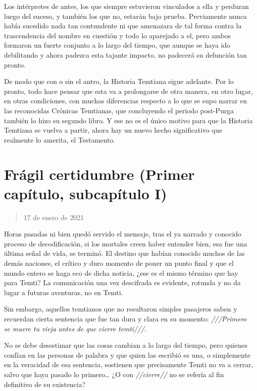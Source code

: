 \documentclass[
  spanish,
]{book}
\begin{document}
Los intérpretes de antes, los que siempre estuvieron vinculados a ella y perduran luego del suceso, y también los que no, estarán bajo prueba. Previamente nunca había sucedido nada tan contundente ni que amenazara de tal forma contra la trascendencia del nombre en cuestión y todo lo aparejado a el, pero ambos formaron un fuerte conjunto a lo largo del tiempo, que aunque se haya ido debilitando y ahora padezca esta tajante impacto, no padecerá su defunción tan pronto.

De modo que con o sin el antro, la Historia Temtiana sigue adelante. Por lo pronto, todo hace pensar que esta va a prolongarse de otra manera, en otro lugar, en otras condiciones, con muchas diferencias respecto a lo que se supo narrar en las reconocidas Crónicas Temtianas, que concluyendo el periodo post-Purga también lo hizo su segundo libro. Y ese no es el único motivo para que la Historia Temtiana se vuelva a partir, ahora hay un nuevo hecho significativo que realmente lo amerita, el Testamento.

\hypertarget{fruxe1gil-certidumbre-primer-capuxedtulo-subcapuxedtulo-i}{%
\section{Frágil certidumbre (Primer capítulo, subcapítulo I)}\label{fruxe1gil-certidumbre-primer-capuxedtulo-subcapuxedtulo-i}}

\begin{quote}
17 de enero de 2021
\end{quote}

Horas pasadas ni bien quedó servido el mensaje, tras el ya narrado y conocido proceso de decodificación, si los mortales creen haber entender bien, esa fue una última señal de vida, se terminó. El destino que habían conocido muchos de las demás naciones, el crítico y duro momento de poner un punto final y que el mundo entero se haga eco de dicha noticia, ¿ese es el mismo término que hay para Temti? La comunicación una vez descifrada es evidente, rotunda y no da lugar a futuras aventuras, no en Temti.

Sin embargo, aquellos temtianos que no resultaron simples pasajeros saben y recuerdan cierta sentencia que fue tan dura y clara en su momento: \emph{///Primero se muere tu vieja antes de que cierre temti///}.

No se debe desestimar que las cosas cambian a lo largo del tiempo, pero quienes confían en las personas de palabra y que quien las escribió es una, o simplemente en la veracidad de esa sentencia, sostienen que precisamente Temti no va a cerrar, salvo que haya pasado lo primero\ldots{} ¿O con \emph{//cierre//} no se refería al fin definitivo de su existencia?
\end{document}
